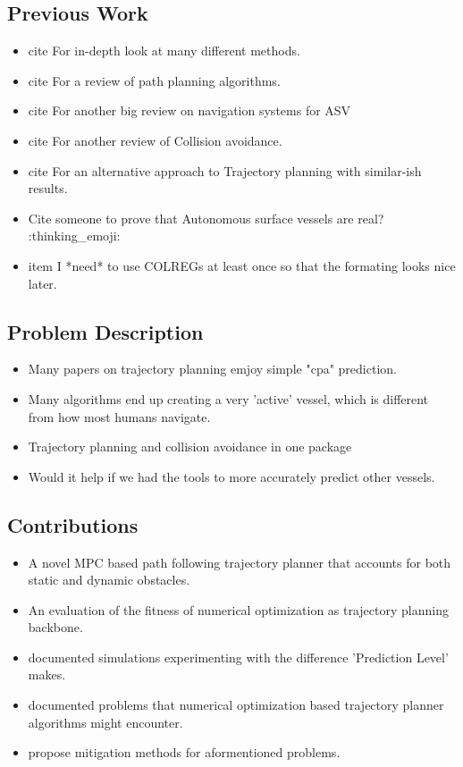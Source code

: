 \subsection{Previous Work}
\begin{itemize}
    \item cite \cite{loe2007collision} For in-depth look at many different methods.
    \item cite \cite{vagale2021path} For a review of path planning algorithms.
    \item cite \cite{zhang2021collision} For another big review on navigation systems for ASV
    \item cite \cite{huang2020ship} For another review of Collision avoidance.
    \item cite \cite{park2020social} For an alternative approach to Trajectory planning with similar-ish results.
    \item Cite someone to prove that Autonomous surface vessels are real? :thinking\_emoji:
    \item item I *need* to use \gls{COLREGs} at least once so that the formating looks nice later.
\end{itemize}

\subsection{Problem Description}
\begin{itemize}
    \item Many papers on trajectory planning emjoy simple "cpa" prediction.
    \item Many algorithms end up creating a very 'active' vessel, which is different from how most humans navigate.
    \item Trajectory planning and collision avoidance in one package
    \item Would it help if we had the tools to more accurately predict other vessels.
\end{itemize}

\subsection{Contributions}
\begin{itemize}
    \item A novel MPC based path following trajectory planner that accounts for both static and dynamic obstacles.
    \item An evaluation of the fitness of numerical optimization as trajectory planning backbone.
    \item documented simulations experimenting with the difference 'Prediction Level' makes.
    \item documented problems that numerical optimization based trajectory planner algorithms might encounter.
    \item propose mitigation methods for aformentioned problems.
\end{itemize}

